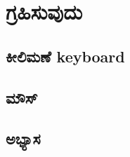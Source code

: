 \chapter{ಗ್ರಹಿಸುವುದು} 

\section{ಕೀಲಿಮಣೆ \textenglish{keyboard}}

\section{ ಮೌಸ್} 

\section{ಅಭ್ಯಾಸ }